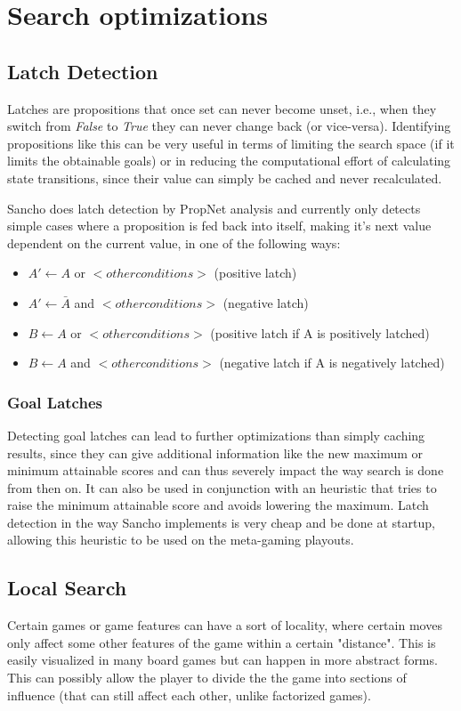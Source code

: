 \section{Search optimizations}

\subsection{Latch Detection}
Latches are propositions that once set can never become unset, i.e., when they switch from \textit{False} to \textit{True} they can never change back (or vice-versa). Identifying propositions like this can be very useful in terms of limiting the search space (if it limits the obtainable goals) or in reducing the computational effort of calculating state transitions, since their value can simply be cached and never recalculated.

Sancho does latch detection by PropNet analysis and currently only detects simple cases where a proposition is fed back into itself, making it's next value dependent on the current value, in one of the following ways:

\begin{itemize}
	\item $A' \leftarrow A$ or $<other conditions>$ (positive latch)
	\item $A' \leftarrow \bar A$ and $<other conditions>$ (negative latch)
	\item $B \leftarrow A$ or $<other conditions>$ (positive latch if A is positively latched)
	\item $B \leftarrow A$ and $<other conditions>$ (negative latch if A is negatively latched)
\end{itemize}


\subsubsection{Goal Latches}
Detecting goal latches can lead to further optimizations than simply caching results, since they can give additional information like the new maximum or minimum attainable scores and can thus severely impact the way search is done from then on. It can also be used in conjunction with an heuristic that tries to raise the minimum attainable score and avoids lowering the maximum.
Latch detection in the way Sancho implements is very cheap and be done at startup, allowing this heuristic to be used on the meta-gaming playouts.

\iffalse
\subsection{Local Search}
Certain games or game features can have a sort of locality, where certain moves only affect some other features of the game within a certain "distance". This is easily visualized in many board games but can happen in more abstract forms. This can possibly allow the player to divide the the game into sections of influence (that can still affect each other, unlike factorized games).

